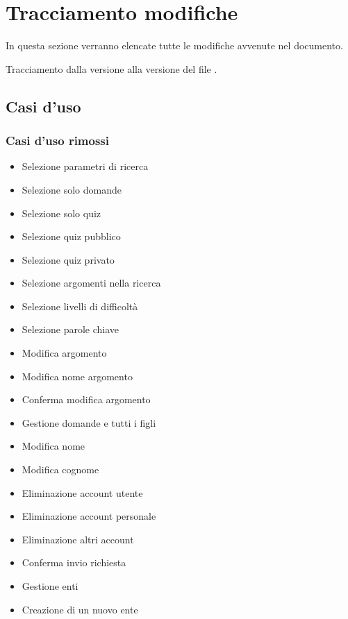 \section{Tracciamento modifiche}
In questa sezione verranno elencate tutte le modifiche avvenute nel documento.

Tracciamento dalla versione  alla versione  del file .

\subsection{Casi d'uso}
\subsubsection{Casi d'uso rimossi}
\begin{itemize}
	\item {} Selezione parametri di ricerca 
	\item {} Selezione solo domande
	\item {} Selezione solo quiz
	\item {} Selezione quiz pubblico
	\item {} Selezione quiz privato
	\item {} Selezione argomenti nella ricerca
	\item {} Selezione livelli di difficoltà
	\item {} Selezione parole chiave
	\item {} Modifica argomento
	\item {} Modifica nome argomento 
	\item {} Conferma modifica argomento
	\item {} Gestione domande e tutti i figli
	\item {} Modifica nome
	\item {} Modifica cognome
	\item {} Eliminazione account utente
	\item {} Eliminazione account personale
	\item {} Eliminazione altri account
	\item {} Conferma invio richiesta 
	\item {} Gestione enti 
	\item {} Creazione di un nuovo ente

\end{itemize}
